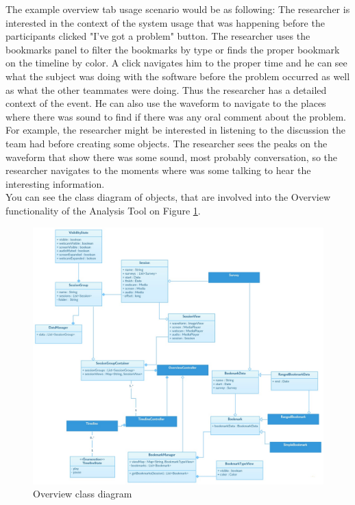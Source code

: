 The example overview tab usage scenario would be as following: The researcher is interested in the context of the system usage that was happening before the participants clicked "I've got a problem" button. The researcher uses the bookmarks panel to filter the bookmarks by type or finds the proper bookmark on the timeline by color. A click navigates him to the proper time and he can see what the subject was doing with the software before the problem occurred as well as what the other teammates were doing. Thus the researcher has a detailed context of the event. He can also use the waveform to navigate to the places where there was sound to find if there was any oral comment about the problem. For example, the researcher might be interested in listening to the discussion the team had before creating some objects. The researcher sees the peaks on the waveform that show there was some sound, most probably conversation, so the researcher navigates to the moments where was some talking to hear the interesting information. \\

You can see the class diagram of objects, that are involved into the Overview functionality of the Analysis Tool on Figure \ref{fig:overview_class_diagram}.\\ 

  \begin{figure}[htb]
 \centering
\includegraphics[width=\textwidth]{figures/overview_class_diagram.jpg}
\caption{Overview class diagram}
\label{fig:overview_class_diagram}
 \end{figure} 
 
